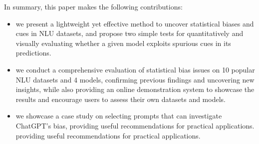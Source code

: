 In summary, this paper makes the following contributions:
\begin{itemize}

\item we present a lightweight yet effective method to uncover statistical biases and cues in NLU datasets, and propose two simple tests for quantitatively and visually evaluating whether a given model exploits spurious cues in its predictions.

\item we conduct a comprehensive evaluation of statistical bias issues on 10 popular NLU datasets and 4 models, confirming previous findings and uncovering new insights, while also providing an online demonstration system to showcase the results and encourage users to assess their own datasets and models.
\item we showcase a case study on selecting prompts that can investigate ChatGPT's bias, 
providing useful recommendations for practical applications.
providing useful recommendations for practical applications. 

\end{itemize}








